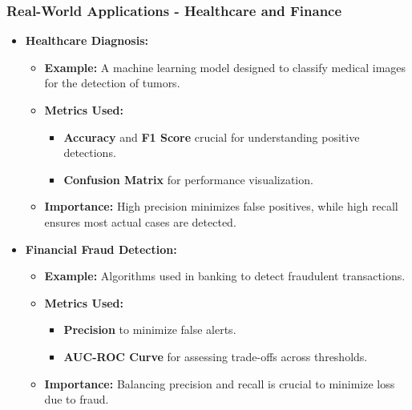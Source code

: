 \documentclass[aspectratio=169]{beamer}
\begin{document}
\begin{frame}[fragile]
    \frametitle{Real-World Applications - Healthcare and Finance}
    \begin{itemize}
        \item \textbf{Healthcare Diagnosis:}
        \begin{itemize}
            \item \textbf{Example:} A machine learning model designed to classify medical images for the detection of tumors.
            \item \textbf{Metrics Used:} 
            \begin{itemize}
                \item \textbf{Accuracy} and \textbf{F1 Score} crucial for understanding positive detections.
                \item \textbf{Confusion Matrix} for performance visualization.
            \end{itemize}
            \item \textbf{Importance:} High precision minimizes false positives, while high recall ensures most actual cases are detected.
        \end{itemize}
        
        \item \textbf{Financial Fraud Detection:}
        \begin{itemize}
            \item \textbf{Example:} Algorithms used in banking to detect fraudulent transactions.
            \item \textbf{Metrics Used:}
            \begin{itemize}
                \item \textbf{Precision} to minimize false alerts.
                \item \textbf{AUC-ROC Curve} for assessing trade-offs across thresholds.
            \end{itemize}
            \item \textbf{Importance:} Balancing precision and recall is crucial to minimize loss due to fraud.
        \end{itemize}
    \end{itemize}
\end{frame}
\end{document}
